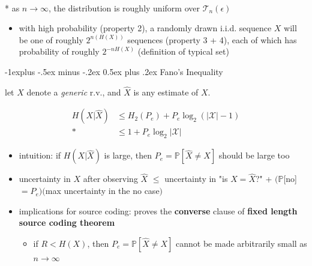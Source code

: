 \documentclass[10pt, landscape]{article}
\makeatletter
\renewcommand{\subsection}{\@startsection{subsection}{2}{0mm}%
  {-1explus -.5ex minus -.2ex}%
  {0.5ex plus .2ex}%
{\normalfont\normalsize\bfseries}}
\makeatother
\begin{document}
\begin{multicols*}{4}
  \begin{tightcenter}
    \\* as $n \to \infty$, the distribution is roughly uniform over $\mathcal{T}_n(\epsilon)$
  \end{tightcenter}

  \begin{itemize}
    \item with high probability (property 2), a randomly drawn i.i.d. sequence $X$ will be one of roughly $2^{n(H(X))}$ sequences (property 3 + 4),
      each of which has probability of roughly $2^{-nH(X)}$ (definition of typical set)
  \end{itemize}


  \subsection{Fano's Inequality}

  let $X$ denote a \textit{generic} r.v., and $\hat{X}$ is any estimate of $X$.

  \begin{tightcenter}
    \begin{align*}
      H(X \vert \hat{X}) &\leq H_2(P_e) + P_e\log_2 (\vert\mathcal{X}\vert -1)  \\*
                         &\leq 1 + P_e \log_2 \vert \mathcal{X} \vert
    \end{align*}
  \end{tightcenter}

  \begin{itemize}
    \item intuition: if $H(X \vert \hat{X})$ is large, then $P_e = \mathbb{P}[\hat{X} \neq X]$ should be large too
    \item uncertainty in $X$ after observing $\hat{X}$ $\leq$ uncertainty in "is $X = \hat{X}$?" + $(\mathbb{P}$[no]$=P_e)($max uncertainty in the no case$)$
    \item implications for source coding: proves the \textbf{converse} clause of \textbf{fixed length source coding theorem}
      \begin{itemize}
        \item if $R < H(X)$, then $P_e = \mathbb{P}[\hat{X} \neq X]$ cannot be made arbitrarily small as $n \to \infty$
      \end{itemize}
  \end{itemize}



\end{multicols*}
\end{document}
